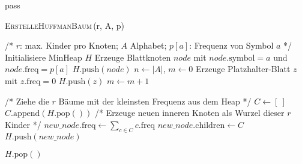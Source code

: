 pass\documentclass[a4paper,10pt,ngerman]{scrartcl}
\begin{document}
    \begin{algorithm} [H]
        \caption{\textsc{ErstelleHuffmanBaum}\,(r, A, p)}
        \label{alg:huffman-r-ary}
        \begin{algorithmic}[1]
                \State /* $r$: max. Kinder pro Knoten; $A$ Alphabet; $p[a]$: Frequenz von Symbol $a$ */
                \State Initialisiere MinHeap $H$
                    \State Erzeuge Blattknoten $node$ mit $node.\text{symbol}\!=\!a$ und $node.\text{freq}\!=\!p[a]$
                    \State $H.\text{push}(node)$
                \EndFor
                \State $n \gets |A|$, \quad $m \gets 0$
                    \State Erzeuge Platzhalter‐Blatt $z$ mit $z.\text{freq}=0$
                    \State $H.\text{push}(z)$
                    \State $m \gets m + 1$
                \EndWhile

                    \State /* Ziehe die $r$ Bäume mit der kleinsten Frequenz aus dem Heap */
                    \State $C \gets [\ ]$ 
                        \State $C.\text{append}(H.\text{pop}())$
                    \EndFor
                    \State /* Erzeuge neuen inneren Knoten als Wurzel dieser $r$ Kinder */
                    \State $new\_node.\text{freq} \gets \sum_{c \in C} c.\text{freq}$
                    \State $new\_node.\text{children} \gets C$
                    \State $H.\text{push}(new\_node)$
                \EndWhile

                \State \Return $H.\text{pop}()$  
            \EndFunction
        \end{algorithmic}
    \end{algorithm}
\end{document}
